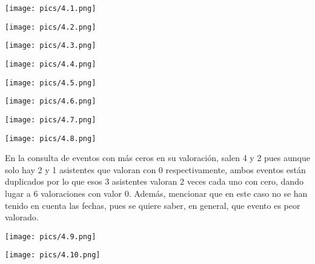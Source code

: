 \documentclass[12pt]{article}
\begin{document}
    \begin{center}{\texttt{[image: pics/4.1.png]}}\end{center}
    \begin{center}{\texttt{[image: pics/4.2.png]}}\end{center}
    \begin{center}{\texttt{[image: pics/4.3.png]}}\end{center}
    \begin{center}{\texttt{[image: pics/4.4.png]}}\end{center}
    \begin{center}{\texttt{[image: pics/4.5.png]}}\end{center}
    \begin{center}{\texttt{[image: pics/4.6.png]}}\end{center}
    \begin{center}{\texttt{[image: pics/4.7.png]}}\end{center}
    \begin{center}{\texttt{[image: pics/4.8.png]}}\end{center}
    
    En la consulta de eventos con más ceros en su valoración, salen 4 y 2 pues aunque solo hay 2 y 1 asistentes que valoran con 0 respectivamente, 
    ambos eventos están duplicados por lo que esos 3 asistentes valoran 2 veces cada uno con cero, dando lugar a 6 valoraciones con valor 0. Además, 
    mencionar que en este caso no se han tenido en cuenta las fechas, pues se quiere saber, en general, que evento es peor valorado.

    \begin{center}{\texttt{[image: pics/4.9.png]}}\end{center}
    \begin{center}{\texttt{[image: pics/4.10.png]}}\end{center}
 
\end{document}
